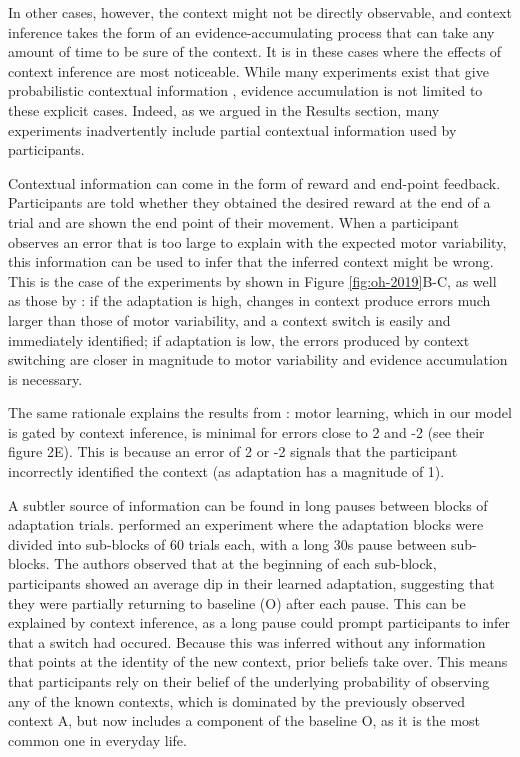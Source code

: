 \documentclass[a4paper,doc,floatsintext,natbib]{apa6}
\def \fref #1{Figure \ref{#1}}     %
\begin{document}
In other cases, however, the context might not be directly observable, and context inference takes the form of an evidence-accumulating process that can take any amount of time to be sure of the context. It is in these cases where the effects of context inference are most noticeable. While many experiments exist that give probabilistic contextual information \cite[e.g.][]{Scholz_uncontrolled_1999,Behrens_Learning_2007,Nassar_Dissociable_2019}, evidence accumulation is not limited to these explicit cases. Indeed, as we argued in the Results section, many experiments inadvertently include partial contextual information used by participants.

Contextual information can come in the form of reward and end-point feedback. Participants are told whether they obtained the desired reward at the end of a trial and are shown the end point of their movement. When a participant observes an error that is too large to explain with the expected motor variability, this information can be used to infer that the inferred context might be wrong. This is the case of the experiments by \cite{Oh_Minimizing_2019} shown in \fref{fig:oh-2019}B-C, as well as those by \cite{Zarahn_Explaining_2008}: if the adaptation is high, changes in context produce errors much larger than those of motor variability, and a context switch is easily and immediately identified; if adaptation is low, the errors produced by context switching are closer in magnitude to motor variability and evidence accumulation is necessary.

The same rationale explains the results from \cite{Davidson_Scaling_2004}: motor learning, which in our model is gated by context inference, is minimal for errors close to 2 and -2 (see their figure 2E). This is because an error of 2 or -2 signals that the participant incorrectly identified the context (as adaptation has a magnitude of 1).

A subtler source of information can be found in long pauses between blocks of adaptation trials. \cite{Ethier_Spontaneous_2008} performed an experiment where the adaptation blocks were divided into sub-blocks of 60 trials each, with a long 30s pause between sub-blocks. The authors observed that at the beginning of each sub-block, participants showed an average dip in their learned adaptation, suggesting that they were partially returning to baseline (O) after each pause. This can be explained by context inference, as a long pause could prompt participants to infer that a switch had occured. Because this was inferred without any information that points at the identity of the new context, prior beliefs take over. This means that participants rely on their belief of the underlying probability of observing any of the known contexts, which is dominated by the previously observed context A, but now includes a component of the baseline O, as it is the most common one in everyday life.
\end{document}
